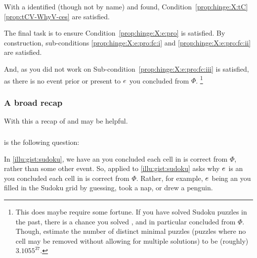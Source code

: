 \begin{note}
  With a \torNa{} identified (though not by name) and \tpro{} found, Condition~\ref{prop:hinge:X:tC} \autoref{prop:tCV-WhyV-ces} are satisfied.

  The final task is to ensure Condition~\ref{prop:hinge:X:e:pro} is satisfied.
  By construction, sub-conditions \ref{prop:hinge:X:e:pro:fc:i} and \ref{prop:hinge:X:e:pro:fc:ii} are satisfied.

  And, as you did not work on \sudokuPuzR{} Sub-condition~\ref{prop:hinge:X:e:pro:fc:iii} is satisfied, as there is no event prior or present to \(e\sb{}\) \inwhich{} you concluded \sudokuRPV{} from \(\Phi\).%
  \footnote{
    This does maybe require some fortune.
    If you have solved Sudoku puzzles in the past, there is a chance you solved \sudokuPuzR{}, and in particular concluded \sudokuRPV{} from \(\Phi\).
    Though, \citeauthor{Berthier:2010aa} estimate the number of distinct minimal puzzles (puzzles where no cell may be removed without allowing for multiple solutions) to be (roughly) \(3.1055^{37}\).
  }
\end{note}



\subsubsection{A broad recap}


\begin{note}
  With this a recap of \qWhy{} and \qHow{} may be helpful.
\end{note}


\subparagraph*{\qWhy{}}


\begin{note}
  \qWhy{} is the following question:

\end{note}


\begin{note}
  In \autoref{illu:gist:sudoku}, we have an  you concluded each cell in \sudokuPuzL{} is correct from \(\Phi\), rather than some other event.
  So, \qWhy{} applied to \autoref{illu:gist:sudoku} asks why \(e\sb{}\) is an  you concluded each cell in \sudokuPuzL{} is correct from \(\Phi\).
  Rather, for example, \(e\sb{}\) being an  you filled in the Sudoku grid by guessing, took a nap, or drew a penguin.
\end{note}


